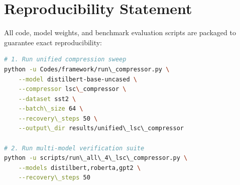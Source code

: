 \section{Reproducibility Statement}
All code, model weights, and benchmark evaluation scripts are packaged to guarantee exact reproducibility:
\begin{lstlisting}[language=bash]
# 1. Run unified compression sweep
python -u Codes/framework/run\_compressor.py \
    --model distilbert-base-uncased \
    --compressor lsc\_compressor \
    --dataset sst2 \
    --batch\_size 64 \
    --recovery\_steps 50 \
    --output\_dir results/unified\_lsc\_compressor

# 2. Run multi-model verification suite
python -u scripts/run\_all\_4\_lsc\_compressor.py \
    --models distilbert,roberta,gpt2 \
    --recovery\_steps 50
\end{lstlisting}
